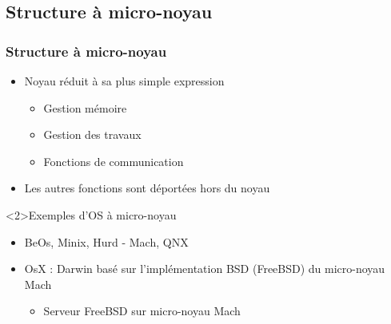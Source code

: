 \subsection{Structure à micro-noyau}

\begin{frame}
\frametitle{Structure à micro-noyau}
\begin{itemize}
\item Noyau réduit à sa plus simple expression
\begin{itemize}
\item Gestion mémoire
\item Gestion des travaux
\item Fonctions de communication
\end{itemize}
\item Les autres fonctions sont déportées hors du noyau
\end{itemize}
\begin{exampleblock}<2>{Exemples d'OS à micro-noyau}
\begin{itemize}
\item BeOs, Minix, Hurd - Mach, QNX

\item OsX : Darwin basé sur l'implémentation BSD (FreeBSD) du micro-noyau Mach
\begin{itemize}
\item Serveur FreeBSD sur micro-noyau Mach
\end{itemize}
\end{itemize}


\end{exampleblock}
\end{frame}



